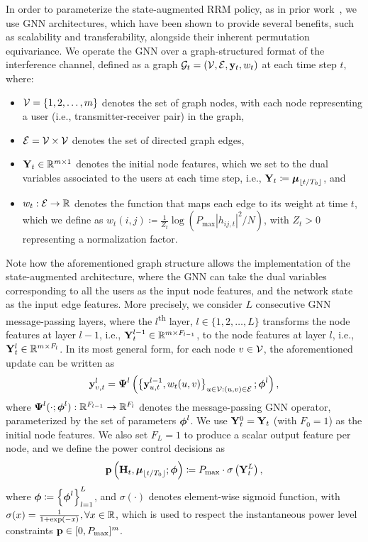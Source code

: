 \documentclass[lettersize,journal]{IEEEtran}
\begin{document}
In order to parameterize the state-augmented RRM policy, as in prior work~\cite{shen2020graph, eisen2020optimal, lee2020graph, naderializadeh2022learning}, we use GNN architectures, which have been shown to provide several benefits, such as scalability and transferability, alongside their inherent permutation equivariance. We operate the GNN over a graph-structured format of the interference channel, defined as a graph ${\mathcal G}_t=({\mathcal V}, {\mathcal E}, {\mathbf y}_t, w_t)$ at each time step $t$, where:
\begin{itemize}
\item ${\mathcal V}=\{1,2,\dots,m\}$ denotes the set of graph nodes, with each node representing a user (i.e., transmitter-receiver pair) in the graph,
\item ${\mathcal E} = {\mathcal V} \times {\ensuremath{\mathcal V}}$ denotes the set of directed graph edges,
\item ${\mathbf Y}_t \in {\mathbb R}^{m \times 1}$ denotes the initial node features, which we set to the dual variables associated to the users at each time step, i.e., ${\mathbf Y}_t \coloneqq \boldsymbol{\mu}_{\lfloor t / T_0 \rfloor}$, and
\item $w_t: {\mathcal E} \to {\mathbb R}$ denotes the function that maps each edge to its weight at time $t$, which we define as $w_t(i, j) \coloneqq \frac{1}{Z_t} \log\left(P_{\max}|h_{ij, t}|^2 / N\right)$, with $Z_t > 0$ representing a normalization factor.
\end{itemize}

Note how the aforementioned graph structure allows the implementation of the state-augmented architecture, where the GNN can take the dual variables corresponding to all the users as the input node features, and the network state as the input edge features. More precisely, we consider $L$ consecutive GNN message-passing layers, where the $l$\textsuperscript{th} layer, $l\in\{1,2,\dots,L\}$ transforms the node features at layer $l-1$, i.e., ${\mathbf Y}_t^{l-1}\in{\mathbb R}^{m \times F_{l-1}}$, to the node features at layer $l$, i.e., ${\mathbf Y}_t^{l}\in{\mathbb R}^{m \times F_{l}}$. In its most general form, for each node $v\in{\ensuremath{\mathcal V}}$, the aforementioned update can be written as
\begin{align}
{\ensuremath{\mathbf y}}_{v,t}^{l} = \boldsymbol{\Psi}^l\left( \left\{{\mathbf y}_{u,t}^{l-1}, w_t(u,v) \right\}_{u\in{\ensuremath{\mathcal V}}: (u,v)\in{\ensuremath{\mathcal E}}}; \boldsymbol{\phi}^l\right),
\end{align}
where $\boldsymbol{\Psi}^l(\cdot; \boldsymbol{\phi}^l): {\mathbb R}^{F_{l-1}} \to {\mathbb R}^{F_{l}}$ denotes the message-passing GNN operator, parameterized by the set of parameters $\boldsymbol{\phi}^l$. We use ${\mathbf Y}_t^0 = {\mathbf Y}_t$ (with $F_0=1$) as the initial node features. We also set $F_{L}=1$ to produce a scalar output feature per node, and we define the power control decisions as
\begin{align}\label{eq:final_power_levels_GNN}
{\ensuremath{\mathbf p}}\left({\mathbf H}_t, \boldsymbol{\mu}_{\lfloor t / T_0 \rfloor};\boldsymbol{\phi}\right) \coloneqq P_{\max} \cdot \sigma\left( {\mathbf Y}_t^L \right),
\end{align}
where $\boldsymbol{\phi} \coloneqq \left\{\boldsymbol{\phi}^l\right\}_{l=1}^L$, and $\sigma(\cdot)$ denotes element-wise sigmoid function, with $\sigma(x)=\frac{1}{1+\exp(-x)}, \forall x\in{\mathbb R}$, which is used to respect the instantaneous power level constraints ${\mathbf p} \in [0, P_{\max}]^m$.
\end{document}
